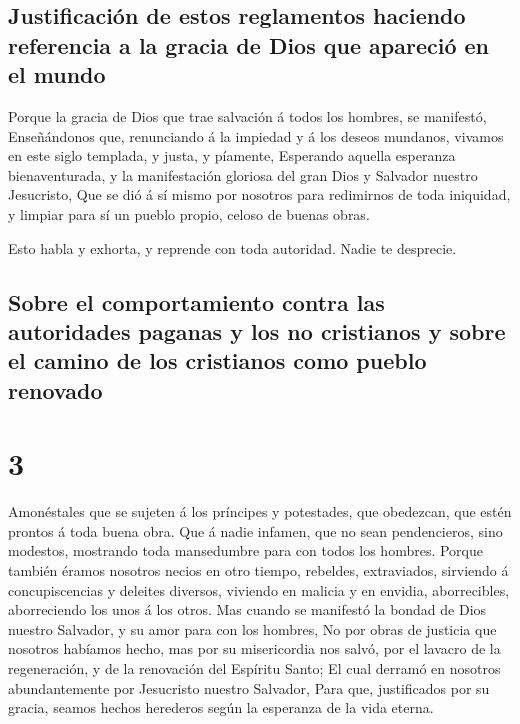 \hypertarget{justificaciuxf3n-de-estos-reglamentos-haciendo-referencia-a-la-gracia-de-dios-que-apareciuxf3-en-el-mundo}{%
\subsection{Justificación de estos reglamentos haciendo referencia a la
gracia de Dios que apareció en el
mundo}\label{justificaciuxf3n-de-estos-reglamentos-haciendo-referencia-a-la-gracia-de-dios-que-apareciuxf3-en-el-mundo}}

 Porque la gracia de Dios que trae salvación á todos los
hombres, se manifestó,  Enseñándonos que, renunciando á la
impiedad y á los deseos mundanos, vivamos en este siglo templada, y
justa, y píamente,  Esperando aquella esperanza
bienaventurada, y la manifestación gloriosa del gran Dios y Salvador
nuestro Jesucristo,  Que se dió á sí mismo por nosotros
para redimirnos de toda iniquidad, y limpiar para sí un pueblo propio,
celoso de buenas obras.

 Esto habla y exhorta, y reprende con toda autoridad. Nadie
te desprecie.

\hypertarget{sobre-el-comportamiento-contra-las-autoridades-paganas-y-los-no-cristianos-y-sobre-el-camino-de-los-cristianos-como-pueblo-renovado}{%
\subsection{Sobre el comportamiento contra las autoridades paganas y los
no cristianos y sobre el camino de los cristianos como pueblo
renovado}\label{sobre-el-comportamiento-contra-las-autoridades-paganas-y-los-no-cristianos-y-sobre-el-camino-de-los-cristianos-como-pueblo-renovado}}

\hypertarget{section-2}{%
\section{3}\label{section-2}}

 Amonéstales que se sujeten á los príncipes y potestades,
que obedezcan, que estén prontos á toda buena obra.  Que á
nadie infamen, que no sean pendencieros, sino modestos, mostrando toda
mansedumbre para con todos los hombres.  Porque también
éramos nosotros necios en otro tiempo, rebeldes, extraviados, sirviendo
á concupiscencias y deleites diversos, viviendo en malicia y en envidia,
aborrecibles, aborreciendo los unos á los otros.  Mas cuando
se manifestó la bondad de Dios nuestro Salvador, y su amor para con los
hombres,  No por obras de justicia que nosotros habíamos
hecho, mas por su misericordia nos salvó, por el lavacro de la
regeneración, y de la renovación del Espíritu Santo;  El
cual derramó en nosotros abundantemente por Jesucristo nuestro Salvador,
 Para que, justificados por su gracia, seamos hechos
herederos según la esperanza de la vida eterna.

